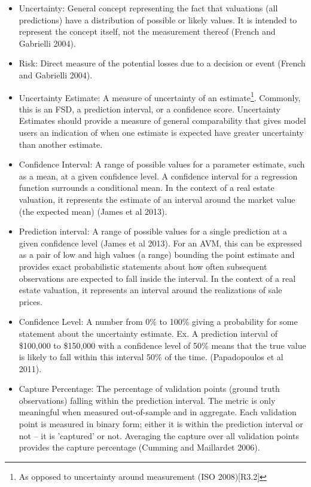 \documentclass[colTwo]{anon}
\theoremstyle{definition}
\begin{document}
\begin{itemize}
\item Uncertainty: General concept representing the fact that valuations (all predictions) have a distribution of possible or likely values.  It is intended to represent the concept itself, not the measurement thereof (French and Gabrielli 2004).
\item Risk: Direct measure of the potential losses due to a decision or event (French and Gabrielli 2004).
\item Uncertainty Estimate: A measure of uncertainty of an estimate\footnote{As opposed to uncertainty around measurement (ISO 2008)[R3.2]}. Commonly, this is an FSD, a prediction interval, or a confidence score. Uncertainty Estimates should provide a measure of general comparability that gives model users an indication of when one estimate is expected have greater uncertainty than another estimate.
\item Confidence Interval: A range of possible values for a parameter estimate, such as a mean, at a given confidence level. A confidence interval for a regression function surrounds a conditional mean. In the context of a real estate valuation, it represents the estimate of an interval around the market value (the expected mean) (James et al 2013).
\item Prediction interval: A range of possible values for a single prediction at a given confidence level (James et al 2013). For an AVM, this can be expressed as a pair of low and high values (a range) bounding the point estimate and provides exact probabilistic statements about how often subsequent observations are expected to fall inside the interval. In the context of a real estate valuation, it represents an interval around the realizations of sale prices.
\item Confidence Level: A number from 0\% to 100\% giving a probability for some statement about the uncertainty estimate. Ex. A prediction interval of \$100,000 to \$150,000 with a confidence level of 50\% means that the true value is likely to fall within this interval 50\% of the time. (Papadopoulos et al 2011).
\item Capture Percentage: The percentage of validation points (ground truth observations) falling within the prediction interval. The metric is only meaningful when measured out-of-sample and in aggregate. Each validation point is measured in binary form; either it is within the prediction interval or not -- it is 'captured' or not. Averaging the capture over all validation points provides the capture percentage (Cumming and Maillardet 2006).

\end{itemize}
\end{document}
